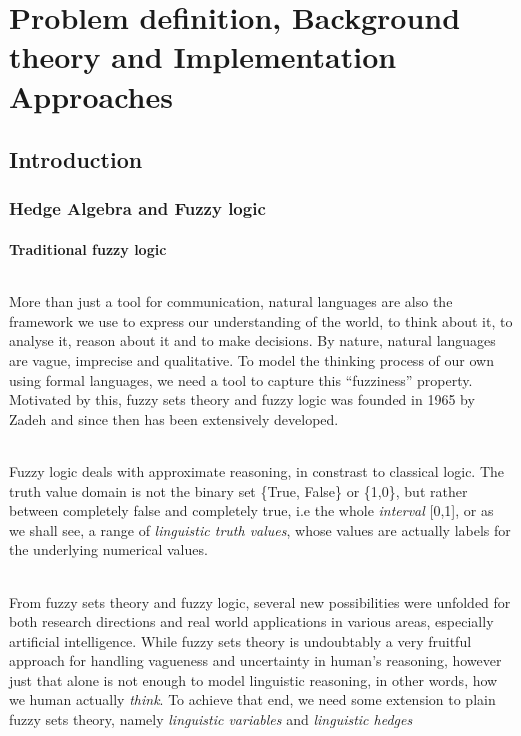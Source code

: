 \documentclass[../gr-final.tex]{subfiles}
\begin{document}
\part{Problem definition, Background theory and Implementation Approaches}
\chapter{Introduction}
\section{Hedge Algebra and Fuzzy logic}
\subsection{Traditional fuzzy logic}
\paragraph{} More than just a tool for communication, natural
languages are also the framework we use to express our
understanding of the world, to think about it, to analyse it, reason about it
and to make decisions. By nature, natural languages are
vague, imprecise and qualitative. To model the thinking process
of our own using formal languages, we need a tool to capture this
``fuzziness'' property. Motivated by this, fuzzy sets theory and
fuzzy logic was founded in 1965 by Zadeh and since then has been
extensively developed. 
\paragraph{} Fuzzy logic deals with approximate reasoning, in
constrast to classical logic. The truth value domain is not the
binary set \{True, False\} or \{1,0\}, but rather between completely
false and completely true, i.e the whole {\em interval} [0,1], or
as we shall see, a range of {\em linguistic truth values}, whose
values are actually labels for the underlying numerical values.
\paragraph{} From fuzzy sets theory and fuzzy logic,
several new possibilities were unfolded for both research
directions and real world applications in various areas,
especially artificial intelligence. While fuzzy sets theory is
undoubtably a very fruitful approach for handling vagueness
and uncertainty in human's reasoning, however just that alone is
not enough to model linguistic reasoning, in other words, how we
human actually {\em think}. To achieve that end, we need some
extension to plain fuzzy sets theory, namely {\em linguistic
variables} and {\em linguistic hedges}
\end{document}
